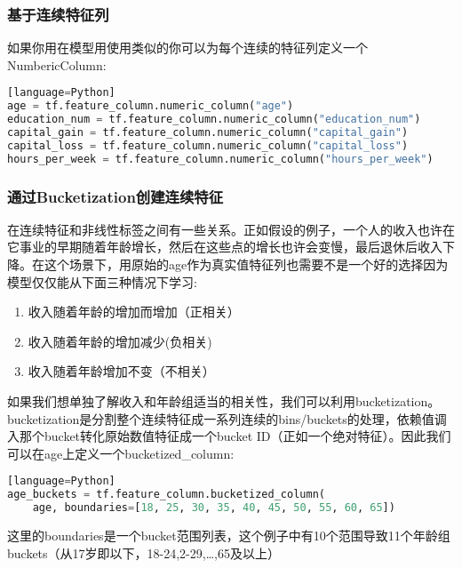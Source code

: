 \subsubsection{基于连续特征列}
如果你用在模型用使用类似的你可以为每个连续的特征列定义一个NumbericColumn:
\begin{lstlisting}[language=Python][language=Python]
age = tf.feature_column.numeric_column("age")
education_num = tf.feature_column.numeric_column("education_num")
capital_gain = tf.feature_column.numeric_column("capital_gain")
capital_loss = tf.feature_column.numeric_column("capital_loss")
hours_per_week = tf.feature_column.numeric_column("hours_per_week")
\end{lstlisting}
\subsubsection{通过Bucketization创建连续特征}
在连续特征和非线性标签之间有一些关系。正如假设的例子，一个人的收入也许在它事业的早期随着年龄增长，然后在这些点的增长也许会变慢，最后退休后收入下降。在这个场景下，用原始的age作为真实值特征列也需要不是一个好的选择因为模型仅仅能从下面三种情况下学习:
\begin{enumerate}
\item 收入随着年龄的增加而增加（正相关）
\item 收入随着年龄的增加减少(负相关)
\item 收入随着年龄增加不变（不相关）
\end{enumerate}
如果我们想单独了解收入和年龄组适当的相关性，我们可以利用bucketization。bucketization是分割整个连续特征成一系列连续的bins/buckets的处理，依赖值调入那个bucket转化原始数值特征成一个bucket ID（正如一个绝对特征）。因此我们可以在age上定义一个bucketized\_column:
\begin{lstlisting}[language=Python][language=Python]
age_buckets = tf.feature_column.bucketized_column(
    age, boundaries=[18, 25, 30, 35, 40, 45, 50, 55, 60, 65])
\end{lstlisting}
这里的boundaries是一个bucket范围列表，这个例子中有10个范围导致11个年龄组buckets（从17岁即以下，18-24,2-29,\ldots,65及以上）
